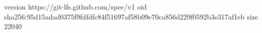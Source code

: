 version https://git-lfs.github.com/spec/v1
oid sha256:95d15adad0375f9fdfdfc84f51697af58b09e70ca856d229f0592b3e317af1eb
size 22040
